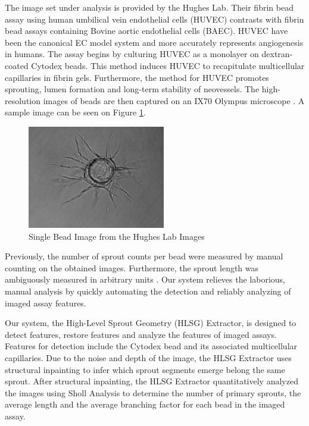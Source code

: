 \documentclass{sig-alternate}
\begin{document}
	The image set under analysis is provided by the Hughes Lab. Their
	fibrin bead assay using human umbilical vein endothelial cells (HUVEC)
	contrasts with fibrin bead assays containing Bovine aortic endothelial
	cells (BAEC). HUVEC have been the canonical EC model system and more
	accurately represents angiogenesis in humans. The assay begins by
	culturing HUVEC as a monolayer on dextran-coated Cytodex beads. This
	method induces HUVEC to recapitulate multicellular capillaries in
	fibrin gels.  Furthermore, the method for HUVEC promotes sprouting,
	lumen formation and long-term stability of neovessels. The
	high-resolution images of beads are then captured on an IX70 Olympus
	microscope \cite{nakatsu03}. A sample image can be seen on Figure
	\ref{fig:monobead}.

	\begin{figure}[ht]
		\centering
		\includegraphics[width=6cm]{images/mono.jpg}
		\caption{Single Bead Image from the Hughes Lab Images}
		\label{fig:monobead}
	\end{figure}

	Previously, the number of sprout counts per bead were measured by manual
	counting on the obtained images. Furthermore, the sprout length was
	ambiguously measured in arbitrary units \cite{nakatsu03}. Our system
	relieves the laborious, manual analysis by quickly automating the detection
	and reliably analyzing of imaged assay features.

	Our system, the High-Level Sprout Geometry (HLSG) Extractor, is designed to
	detect features, restore features and analyze the features of imaged
	assays. Features for detection include the Cytodex bead and its associated
	multicellular capillaries. Due to the noise and depth of the image, the
	HLSG Extractor uses structural inpainting to infer which sprout segments
	emerge belong the same sprout. After structural inpainting, the HLSG
	Extractor quantitatively analyzed the images using Sholl Analysis to
	determine the number of primary sprouts, the average length and the average
	branching factor for each bead in the imaged assay.
\end{document}
